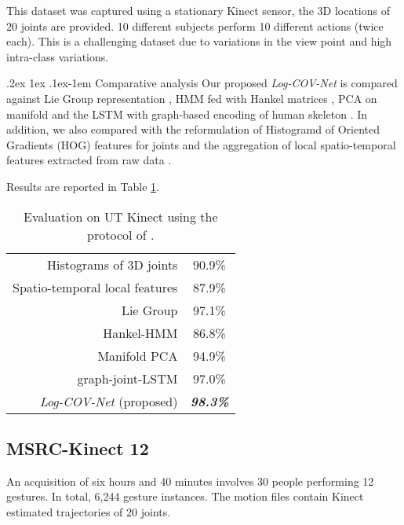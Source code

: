 \documentclass[10pt,twocolumn]{article}
\makeatletter
\renewcommand{\paragraph}{%
	\@startsection{paragraph}{4}%
	{\z@}{.2ex \@plus 1ex \@minus .1ex}{-1em}%
	{\normalfont\normalsize\bfseries}%
}
\makeatother
\begin{document}
This dataset was captured using a stationary Kinect sensor, the 3D locations of 20 joints are provided. 10 different subjects perform 10 different actions (twice each). This is a challenging dataset due to variations in the view point and high intra-class variations.

\paragraph{Comparative analysis} Our proposed \textit{Log-COV-Net} is compared against Lie Group representation \cite{Vemulapalli:CVPR14}, HMM fed with Hankel matrices \cite{Camps:ACCV14}, PCA on manifold \cite{ela} and the LSTM with graph-based encoding of human skeleton \cite{Liu:ECCV16}. In addition, we also compared with the reformulation of Histogramd of Oriented Gradients (HOG) features for joints \cite{H3DJ} and the aggregation of local spatio-temporal features extracted from raw data \cite{randforest}.

Results are reported in Table \ref{tab:UT}.

\begin{table}[h!]
	\centering
	\begin{tabular}{|rc|}
	\hline
	Histograms of 3D joints \cite{H3DJ} & 90.9\% \\
	Spatio-temporal local features \cite{randforest} & 87.9\% \\ 
	Lie Group \cite{Vemulapalli:CVPR14} & 97.1\% \\ 
	Hankel-HMM \cite{Camps:ACCV14} & 86.8\% \\
	Manifold PCA \cite{ela} & 94.9\% \\
	graph-joint-LSTM \cite{Liu:ECCV16} & 97.0\% \\ \hline \hline
	\textit{\textit{Log-COV-Net} } (proposed) & \textit{\textbf{98.3\%}} \\ \hline
\end{tabular}\vspace{5pt}
	\caption{Evaluation on UT Kinect using the protocol of \cite{Vemulapalli:CVPR14}.}
\label{tab:UT}
\end{table}

\subsection{MSRC-Kinect 12}

An acquisition of six hours and 40 minutes involves 30 people performing 12 gestures. In total, 6,244 gesture instances. The motion files contain Kinect estimated trajectories of 20 joints. 
\end{document}
